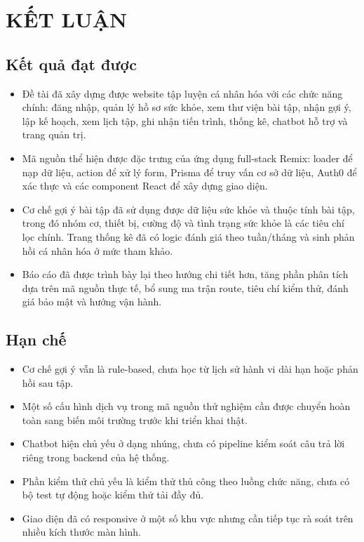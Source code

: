 \chapter*{KẾT LUẬN}

\section*{Kết quả đạt được}

\begin{itemize}

    \item Đề tài đã xây dựng được website tập luyện cá nhân hóa với các chức năng chính: đăng nhập, quản lý hồ sơ sức khỏe, xem thư viện bài tập, nhận gợi ý, lập kế hoạch, xem lịch tập, ghi nhận tiến trình, thống kê, chatbot hỗ trợ và trang quản trị.

    \item Mã nguồn thể hiện được đặc trưng của ứng dụng full-stack Remix: loader để nạp dữ liệu, action để xử lý form, Prisma để truy vấn cơ sở dữ liệu, Auth0 để xác thực và các component React để xây dựng giao diện.

    \item Cơ chế gợi ý bài tập đã sử dụng được dữ liệu sức khỏe và thuộc tính bài tập, trong đó nhóm cơ, thiết bị, cường độ và tình trạng sức khỏe là các tiêu chí lọc chính. Trang thống kê đã có logic đánh giá theo tuần/tháng và sinh phản hồi cá nhân hóa ở mức tham khảo.

    \item Báo cáo đã được trình bày lại theo hướng chi tiết hơn, tăng phần phân tích dựa trên mã nguồn thực tế, bổ sung ma trận route, tiêu chí kiểm thử, đánh giá bảo mật và hướng vận hành.

\end{itemize}

\section*{Hạn chế}

\begin{itemize}

    \item Cơ chế gợi ý vẫn là rule-based, chưa học từ lịch sử hành vi dài hạn hoặc phản hồi sau tập.

    \item Một số cấu hình dịch vụ trong mã nguồn thử nghiệm cần được chuyển hoàn toàn sang biến môi trường trước khi triển khai thật.

    \item Chatbot hiện chủ yếu ở dạng nhúng, chưa có pipeline kiểm soát câu trả lời riêng trong backend của hệ thống.

    \item Phần kiểm thử chủ yếu là kiểm thử thủ công theo luồng chức năng, chưa có bộ test tự động hoặc kiểm thử tải đầy đủ.

    \item Giao diện đã có responsive ở một số khu vực nhưng cần tiếp tục rà soát trên nhiều kích thước màn hình.

\end{itemize}

